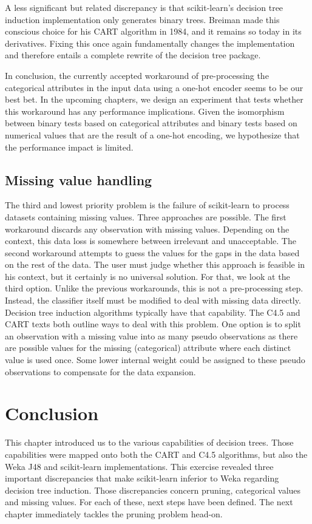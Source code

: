 A less significant but related discrepancy is that scikit-learn's decision tree induction implementation only generates binary trees. Breiman made this conscious choice for his CART algorithm in 1984, and it remains so today in its derivatives. Fixing this once again fundamentally changes the implementation and therefore entails a complete rewrite of the decision tree package.

In conclusion, the currently accepted workaround of pre-processing the categorical attributes in the input data using a one-hot encoder seems to be our best bet. In the upcoming chapters, we design an experiment that tests whether this workaround has any performance implications. Given the isomorphism between binary tests based on categorical attributes and binary tests based on numerical values that are the result of a one-hot encoding, we hypothesize that the performance impact is limited.

\subsection{Missing value handling}
The third and lowest priority problem is the failure of scikit-learn to process datasets containing missing values. Three approaches are possible. The first workaround discards any observation with missing values. Depending on the context, this data loss is somewhere between irrelevant and unacceptable. The second workaround attempts to guess the values for the gaps in the data based on the rest of the data. The user must judge whether this approach is feasible in his context, but it certainly is no universal solution. For that, we look at the third option. Unlike the previous workarounds, this is not a pre-processing step. Instead, the classifier itself must be modified to deal with missing data directly. Decision tree induction algorithms typically have that capability. The C4.5 and CART texts both outline ways to deal with this problem. One option is to split an observation with a missing value into as many pseudo observations as there are possible values for the missing (categorical) attribute where each distinct value is used once. Some lower internal weight could be assigned to these pseudo observations to compensate for the data expansion.

\section{Conclusion}
This chapter introduced us to the various capabilities of decision trees. Those capabilities were mapped onto both the CART and C4.5 algorithms, but also the Weka J48 and scikit-learn implementations. This exercise revealed three important discrepancies that make scikit-learn inferior to Weka regarding decision tree induction. Those discrepancies concern pruning, categorical values and missing values. For each of these, next steps have been defined. The next chapter immediately tackles the pruning problem head-on.
